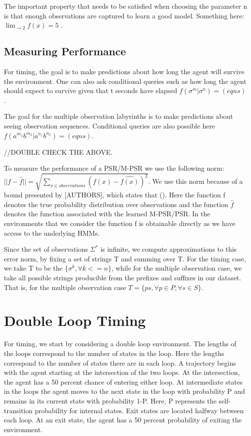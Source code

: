 The important property that needs to be satisfied when choosing the parameter n is that enough observations are captured to learn a good model. Something here: $\lim_{ \to 2} f(x) = 5$ .

\subsection{Measuring Performance}
For timing, the goal is to make predictions about how long the agent will survive the environment. One can also ask conditional queries such as how long the agent should expect to survive given that t seconds have elapsed $f(\sigma^m|\sigma^n) = (eqns)$. 

The goal for the multiple observation labyrinths is to make predictions about seeing observation sequences. Conditional queries are also possible here $f(a^{m_1}b^{m_2}|a^{n_1}b^{n_2}) = (eqns)$.

//DOUBLE CHECK THE ABOVE.

To measure the performance of a PSR/M-PSR we use the following norm:
$||f - \hat{f}|| = \sqrt{\sum\nolimits_{x \in observations}(f(x) - \hat{f(x)})^2}$. We use this norm because of a bound presented by [AUTHORS], which states that (). Here the function f denotes the true probability distribution over observations and the function $\hat{f}$ denotes the function associated with the learned M-PSR/PSR. In the environments that we consider the function f is obtainable directly as we have access to the underlying HMMs.

Since the set of observations $\Sigma^*$ is infinite, we compute approximations to this error norm, by fixing a set of strings T and summing over T. For the timing case, we take T to be the $\{\sigma^k, \forall k<=n\}$, while for the multiple observation case, we take all possible strings producible from the prefixes and suffixes in our dataset. That is, for the multiple observation case $T = \{ps, \forall p \in P, \forall s \in S\}$.

\section{Double Loop Timing}

For timing, we start by considering a double loop environment. The lengths of the loops correspond to the number of states in the loop. Here the lengths correspond to the number of states there are in each loop. A trajectory begins with the agent starting at the intersection of the two loops. At the intersection, the agent has a 50 percent chance of entering either loop. At intermediate states in the loops the agent moves to the next state in the loop with probability P and remains in its current state with probability 1-P. Here, P represents the self-transition probability for internal states. Exit states are located halfway between each loop. At an exit state, the agent has a 50 percent probability of exiting the environment. 

